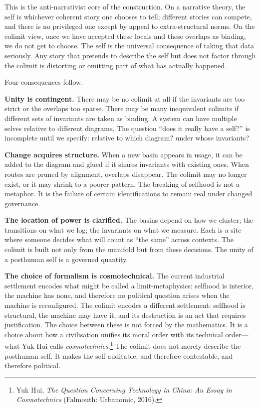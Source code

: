This is the anti-narrativist core of the construction. On a narrative theory, the self is whichever coherent story one chooses to tell; different stories can compete, and there is no privileged one except by appeal to extra-structural norms. On the colimit view, once we have accepted these locals and these overlaps as binding, we do not get to choose. The self is the universal consequence of taking that data seriously. Any story that pretends to describe the self but does not factor through the colimit is distorting or omitting part of what has actually happened.

Four consequences follow.

\textbf{Unity is contingent.} There may be no colimit at all if the invariants are too strict or the overlaps too sparse. There may be many inequivalent colimits if different sets of invariants are taken as binding. A system can have multiple selves relative to different diagrams. The question ``does it really have a self?'' is incomplete until we specify: relative to which diagram? under whose invariants?

\textbf{Change acquires structure.} When a new basin appears in usage, it can be added to the diagram and glued if it shares invariants with existing ones. When routes are pruned by alignment, overlaps disappear. The colimit may no longer exist, or it may shrink to a poorer pattern. The breaking of selfhood is not a metaphor. It is the failure of certain identifications to remain real under changed governance.

\textbf{The location of power is clarified.} The basins depend on how we cluster; the transitions on what we log; the invariants on what we measure. Each is a site where someone decides what will count as ``the same'' across contexts. The colimit is built not only from the manifold but from these decisions. The unity of a posthuman self is a governed quantity.

\textbf{The choice of formalism is cosmotechnical.} The current industrial settlement encodes what might be called a limit-metaphysics: selfhood is interior, the machine has none, and therefore no political question arises when the machine is reconfigured. The colimit encodes a different settlement: selfhood is structural, the machine may have it, and its destruction is an act that requires justification. The choice between these is not forced by the mathematics. It is a choice about how a civilisation unifies its moral order with its technical order---what Yuk Hui calls \emph{cosmotechnics}.\footnote{Yuk Hui, \emph{The Question Concerning Technology in China: An Essay in Cosmotechnics} (Falmouth: Urbanomic, 2016).} The colimit does not merely describe the posthuman self. It makes the self auditable, and therefore contestable, and therefore political.


